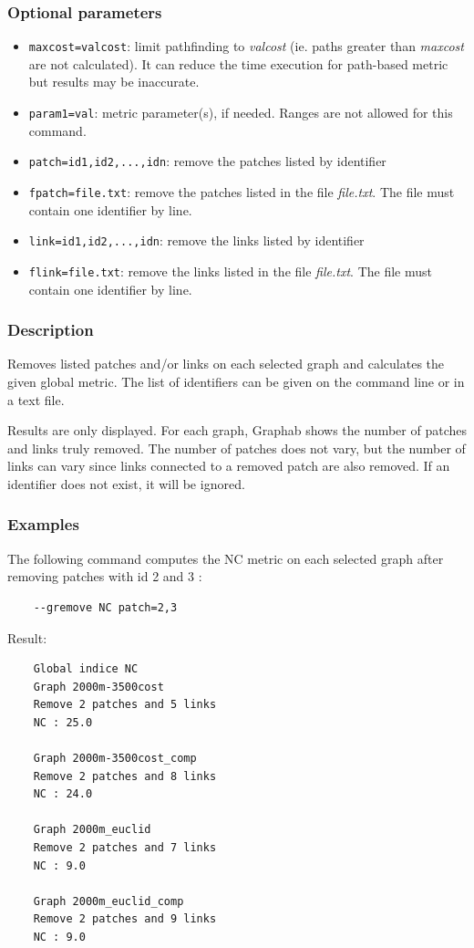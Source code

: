 \documentclass[a4paper,10pt]{report}
\begin{document}
\subsubsection{Optional parameters}
\begin{itemize}
	\item \verb|maxcost=valcost|: limit pathfinding to \textit{valcost} (ie. paths greater than \textit{maxcost} are not calculated). It can reduce the time execution for path-based metric but results may be inaccurate.
	\item \verb|param1=val|: metric parameter(s), if needed. Ranges are not allowed for this command.
	\item \verb|patch=id1,id2,...,idn|: remove the patches listed by identifier
	\item \verb|fpatch=file.txt|: remove the patches listed in the file \textit{file.txt}. The file must contain one identifier by line.
	\item \verb|link=id1,id2,...,idn|: remove the links listed by identifier
	\item \verb|flink=file.txt|: remove the links listed in the file \textit{file.txt}. The file must contain one identifier by line.
\end{itemize}

\subsubsection{Description}
Removes listed patches and/or links on each selected graph and calculates the given global metric.
The list of identifiers can be given on the command line or in a text file.

Results are only displayed.
For each graph, Graphab shows the number of patches and links truly removed. The number of patches does not vary, but the number of links can vary since links connected to a removed patch are also removed. If an identifier does not exist, it will be ignored.

\subsubsection{Examples}
The following command computes the NC metric on each selected graph after removing patches with id 2 and 3 :
\begin{Verbatim}
	--gremove NC patch=2,3
\end{Verbatim}
Result: 
\begin{Verbatim}
	Global indice NC
	Graph 2000m-3500cost
	Remove 2 patches and 5 links
	NC : 25.0
	
	Graph 2000m-3500cost_comp
	Remove 2 patches and 8 links
	NC : 24.0
	
	Graph 2000m_euclid
	Remove 2 patches and 7 links
	NC : 9.0
	
	Graph 2000m_euclid_comp
	Remove 2 patches and 9 links
	NC : 9.0
\end{Verbatim}
\end{document}
